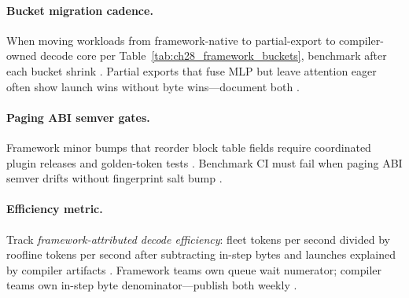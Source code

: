 \paragraph{Bucket migration cadence.} When moving workloads from framework-native to partial-export to compiler-owned decode core per Table~\ref{tab:ch28_framework_buckets}, benchmark after each bucket shrink \citep{patel2025llminference,yirage2026,chen2020compilerbasedhardw,kwon2023vllm,taxbreak2026,memoryfloor2026,liu2024deepseekv3,nvidia2024cudagraphs,dao2022flashattention,amd2024aie,amd2024xdna,dlbook,dao2023flashdecoding,nvidia2022hopper,semianalysis2024tma}. Partial exports that fuse MLP but leave attention eager often show launch wins without byte wins---document both \citep{taxbreak2026,memoryfloor2026,yirage2026,chen2020compilerbasedhardw,patel2025llminference,kwon2023vllm,dlbook}.

\paragraph{Paging ABI semver gates.} Framework minor bumps that reorder block table fields require coordinated plugin releases and golden-token tests \citep{kwon2023vllm,yirage2026,chen2020compilerbasedhardw,patel2025llminference,memoryfloor2026,taxbreak2026,dao2022flashattention,liu2024deepseekv3,nvidia2024cudagraphs,amd2024aie,amd2024xdna,dlbook,dao2023flashdecoding,nvidia2022hopper,semianalysis2024tma}. Benchmark CI must fail when paging ABI semver drifts without fingerprint salt bump \citep{yirage2026,chen2020compilerbasedhardw,kwon2023vllm,patel2025llminference,memoryfloor2026,taxbreak2026,dlbook}.

\paragraph{Efficiency metric.} Track \emph{framework-attributed decode efficiency}: fleet tokens per second divided by roofline tokens per second after subtracting in-step bytes and launches explained by compiler artifacts \citep{patel2025llminference,taxbreak2026,memoryfloor2026,yirage2026,chen2020compilerbasedhardw,kwon2023vllm,liu2024deepseekv3,nvidia2024cudagraphs,dao2022flashattention,amd2024aie,amd2024xdna,dlbook,dao2023flashdecoding,nvidia2022hopper,semianalysis2024tma}. Framework teams own queue wait numerator; compiler teams own in-step byte denominator---publish both weekly \citep{yirage2026,patel2025llminference,chen2020compilerbasedhardw,kwon2023vllm,memoryfloor2026,taxbreak2026,dlbook}.

